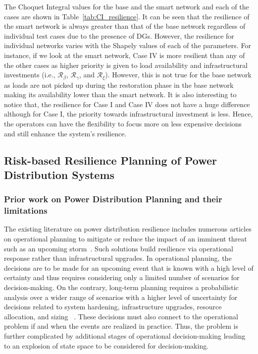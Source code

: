 The Choquet Integral values for the base and the smart network and each of the cases are shown in Table~\ref{tab:CI_resilience}. It can be seen that the resilience of the smart network is always greater than that of the base network regardless of individual test cases due to the presence of DGs. However, the resilience for individual networks varies with the Shapely values of each of the parameters. For instance, if we look at the smart network, Case IV is more resilient than any of the other cases as higher priority is given to load availability and infrastructural investments (i.e., $\mathcal{R}_\beta$, $\mathcal{R}_\gamma$, and $\mathcal{R}_\xi$). However, this is not true for the base network as loads are not picked up during the restoration phase in the base network making its availability lower than the smart network. It is also interesting to notice that, the resilience for Case I and Case IV does not have a huge difference although for Case I, the priority towards infrastructural investment is less. Hence, the operators can have the flexibility to focus more on less expensive decisions and still enhance the system's resilience.       


\newpage
\subsection{Risk-based Resilience Planning of Power Distribution Systems}
\subsubsection{Prior work on Power Distribution Planning and their limitations}
The existing literature on power distribution resilience includes numerous articles on operational planning to mitigate or reduce the impact of an imminent threat such as an upcoming storm~\cite{8409997}. Such solutions build resilience via operational response rather than infrastructural upgrades. In operational planning, the decisions are to be made for an upcoming event that is known with a high level of certainty and thus requires considering only a limited number of scenarios for decision-making. On the contrary, long-term planning requires a probabilistic analysis over a wider range of scenarios with a higher level of uncertainty for decisions related to system hardening, infrastructure upgrades, resource allocation, and sizing ~\cite{7381672}. These decisions must also connect to the operational problem if and when the events are realized in practice. Thus, the problem is further complicated by additional stages of operational decision-making leading to an explosion of state space to be considered for decision-making. 

